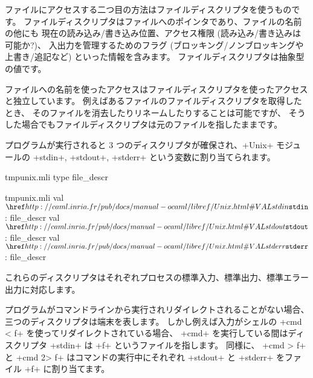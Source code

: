 ファイルにアクセスする二つ目の方法はファイルディスクリプタを使うものです。
ファイルディスクリプタはファイルへのポインタであり、ファイルの名前の他にも
現在の読み込み/書き込み位置、アクセス権限 (読み込み/書き込みは可能か?)、
入出力を管理するためのフラグ (ブロッキング/ノンブロッキングや上書き/追記など)
といった情報を含みます。
ファイルディスクリプタは抽象型  の値です。

ファイルへの名前を使ったアクセスはファイルディスクリプタを使ったアクセスと独立しています。
例えばあるファイルのファイルディスクリプタを取得したとき、
そのファイルを消去したりリネームしたりすることは可能ですが、
そうした場合でもファイルディスクリプタは元のファイルを指したままです。

プログラムが実行されると 3 つのディスクリプタが確保され、\ml+Unix+ モジュールの
\ml+stdin+, \ml+stdout+, \ml+stderr+ という変数に割り当てられます。
\begin{codefile}{tmpunix.mli}
type file_descr
\end{codefile}
\begin{listingcodefile}{tmpunix.mli}
val $\indexlibvalue{Unix}{stdin}$ : file_descr
val $\indexlibvalue{Unix}{stdout}$ : file_descr
val $\indexlibvalue{Unix}{stderr}$ : file_descr
\end{listingcodefile}
これらのディスクリプタはそれぞれプロセスの標準入力、標準出力、標準エラー出力に対応します。

プログラムがコマンドラインから実行されリダイレクトされることがない場合、
三つのディスクリプタは端末を表します。
しかし例えば入力がシェルの \ml+cmd < f+ を使ってリダイレクトされている場合、
\ml+cmd+ を実行している間はディスクリプタ \ml+stdin+ は \ml+f+ というファイルを指します。
同様に、 \ml+cmd > f+ と \ml+cmd 2> f+ はコマンドの実行中にそれぞれ \ml+stdout+ と \ml+stderr+ をファイル \ml+f+ に割り当てます。


